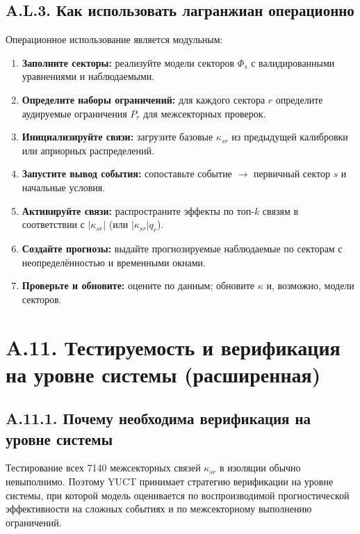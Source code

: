 \documentclass[11pt,a4paper]{article}
\begin{document}
	\subsection*{A.L.3. Как использовать лагранжиан операционно}
	Операционное использование является модульным:
	\begin{enumerate}[leftmargin=*]
		\item \textbf{Заполните секторы:} реализуйте модели секторов $\Phi_s$ с валидированными уравнениями и наблюдаемыми.
		\item \textbf{Определите наборы ограничений:} для каждого сектора $r$ определите аудируемые ограничения $P_r$ для межсекторных проверок.
		\item \textbf{Инициализируйте связи:} загрузите базовые $\kappa_{sr}$ из предыдущей калибровки или априорных распределений.
		\item \textbf{Запустите вывод события:} сопоставьте событие $\to$ первичный сектор $s$ и начальные условия.
		\item \textbf{Активируйте связи:} распространите эффекты по топ-$k$ связям в соответствии с $|\kappa_{sr}|$ (или $|\kappa_{sr}|q_r$).
		\item \textbf{Создайте прогнозы:} выдайте прогнозируемые наблюдаемые по секторам с неопределённостью и временными окнами.
		\item \textbf{Проверьте и обновите:} оцените по данным; обновите $\kappa$ и, возможно, модели секторов.
	\end{enumerate}
	
	\section*{A.11. Тестируемость и верификация на уровне системы (расширенная)}
	\label{sec:extended-testability}
	
	\subsection*{A.11.1. Почему необходима верификация на уровне системы}
	Тестирование всех 7140 межсекторных связей $\kappa_{sr}$ в изоляции обычно невыполнимо. Поэтому YUCT принимает стратегию верификации на уровне системы, при которой модель оценивается по воспроизводимой прогностической эффективности на сложных событиях и по межсекторному выполнению ограничений.
	
\end{document}
